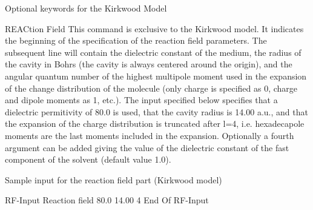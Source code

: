 Optional keywords for the Kirkwood Model
\begin{keywordlist}
\item[REACtion Field]
This command is exclusive to the Kirkwood model.
It indicates the beginning of the specification of the
reaction field parameters. The subsequent line will contain
the dielectric constant of the medium, the radius of the
cavity in Bohrs (the cavity is always centered around the
origin), and the angular quantum number of the highest multipole
moment used in the expansion of the change distribution of
the molecule (only charge is specified as 0, charge and dipole
moments as 1, etc.).
The input specified below specifies that
a dielectric permitivity of 80.0 is used, that the cavity radius is 14.00 a.u.,
and that the expansion of the charge distribution is truncated after l=4, i.e. hexadecapole
moments are the last moments included in the expansion.
Optionally a fourth argument can be added giving the value of the dielectric constant of the
fast component of the solvent (default value 1.0).
\end{keywordlist}
Sample input for the reaction field part (Kirkwood model)

\begin{inputlisting}
RF-Input
Reaction field
80.0 14.00 4
End Of RF-Input
\end{inputlisting}

